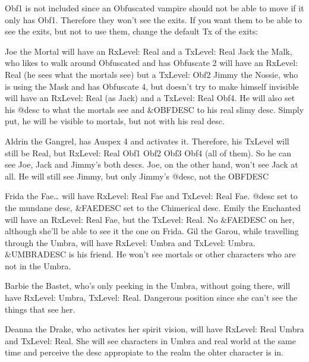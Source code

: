 \documentclass[letterpaper,10pt,english]{sphinxmanual}
\begin{document}
\sphinxAtStartPar
Obf1 is not included since an Obfuscated vampire should not be able to move
if it only has Obf1. Therefore they won’t see the exits. If you want them
to be able to see the exits, but not to use them, change the default Tx of
the exits:

\begin{sphinxVerbatim}[commandchars=\\\{\}]
 
 
\end{sphinxVerbatim}

\sphinxAtStartPar
Joe the Mortal will have an RxLevel: Real and a TxLevel: Real
Jack the Malk, who likes to walk around Obfuscated and has Obfuscate 2 will
have an RxLevel: Real (he sees what the mortals see) but a TxLevel: Obf2
Jimmy the Nossie, who is using the Mask and has Obfuscate 4, but doesn’t
try to make himself invisible will have an RxLevel: Real (as Jack)
and a TxLevel: Real Obf4. He will also set his @desc to what the mortals see and
\&OBFDESC to his real slimy desc. Simply put, he will be visible to mortals,
but not with his real desc.

\sphinxAtStartPar
Aldrin the Gangrel, has Auspex 4 and activates it. Therefore, his TxLevel
will still be Real, but RxLevel: Real Obf1 Obf2 Obf3 Obf4 (all of them). So
he can see Joe, Jack and Jimmy’s both descs.
Joe, on the other hand, won’t see Jack at all. He will still see Jimmy, but
only Jimmy’s @desc, not the OBFDESC

\sphinxAtStartPar
Frida the Fae… will have RxLevel: Real Fae and TxLevel: Real Fae. @desc
set to the mundane desc, \&FAEDESC set to the Chimerical desc.
Emily the Enchanted will have an RxLevel: Real Fae, but the TxLevel: Real.
No \&FAEDESC on her, although she’ll be able to see it the one on Frida.
Gil the Garou, while travelling through the Umbra, will have RxLevel: Umbra
and TxLevel: Umbra. \&UMBRADESC is his friend. He won’t see mortals or other
characters who are not in the Umbra.

\sphinxAtStartPar
Barbie the Bastet, who’s only peeking in the Umbra, without going there,
will have RxLevel: Umbra, TxLevel: Real. Dangerous position since she
can’t see the things that see her.

\sphinxAtStartPar
Deanna the Drake, who activates her spirit vision, will have
RxLevel: Real Umbra and TxLevel: Real. She will see characters in Umbra and
real world at the same time and perceive the desc appropiate to the realm
the ohter character is in.
\end{document}
